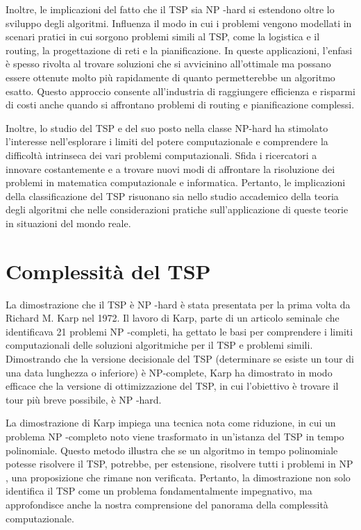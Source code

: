Inoltre, le implicazioni del fatto che il \gls{TSP} sia \gls{NP} -hard si estendono oltre lo sviluppo degli algoritmi. Influenza il modo in cui i problemi vengono modellati in scenari pratici in cui sorgono problemi simili al \gls{TSP}, come la logistica e il routing, la progettazione di reti e la pianificazione. In queste applicazioni, l'enfasi è spesso rivolta al trovare soluzioni che si avvicinino all'ottimale ma possano essere ottenute molto più rapidamente di quanto permetterebbe un algoritmo esatto. Questo approccio consente all'industria di raggiungere efficienza e risparmi di costi anche quando si affrontano problemi di routing e pianificazione complessi.

Inoltre, lo studio del \gls{TSP} e del suo posto nella classe \gls{NP}-hard ha stimolato l'interesse nell'esplorare i limiti del potere computazionale e comprendere la difficoltà intrinseca dei vari problemi computazionali. Sfida i ricercatori a innovare costantemente e a trovare nuovi modi di affrontare la risoluzione dei problemi in matematica computazionale e informatica. Pertanto, le implicazioni della classificazione del \gls{TSP} risuonano sia nello studio accademico della teoria degli algoritmi che nelle considerazioni pratiche sull'applicazione di queste teorie in situazioni del mondo reale.

\section{Complessità del \gls{TSP}}

La dimostrazione che il \gls{TSP} è \gls{NP} -hard è stata presentata per la prima volta da Richard M. Karp nel 1972. Il lavoro di Karp, parte di un articolo seminale che identificava 21 problemi \gls{NP} -completi, ha gettato le basi per comprendere i limiti computazionali delle soluzioni algoritmiche per il \gls{TSP} e problemi simili. Dimostrando che la versione decisionale del \gls{TSP} (determinare se esiste un tour di una data lunghezza o inferiore) è \gls{NP}-complete, Karp ha dimostrato in modo efficace che la versione di ottimizzazione del \gls{TSP}, in cui l'obiettivo è trovare il tour più breve possibile, è \gls{NP} -hard.

La dimostrazione di Karp impiega una tecnica nota come riduzione, in cui un problema \gls{NP} -completo noto viene trasformato in un'istanza del \gls{TSP} in tempo polinomiale. Questo metodo illustra che se un algoritmo in tempo polinomiale potesse risolvere il \gls{TSP}, potrebbe, per estensione, risolvere tutti i problemi in \gls{NP} , una proposizione che rimane non verificata. Pertanto, la dimostrazione non solo identifica il \gls{TSP} come un problema fondamentalmente impegnativo, ma approfondisce anche la nostra comprensione del panorama della complessità computazionale.

